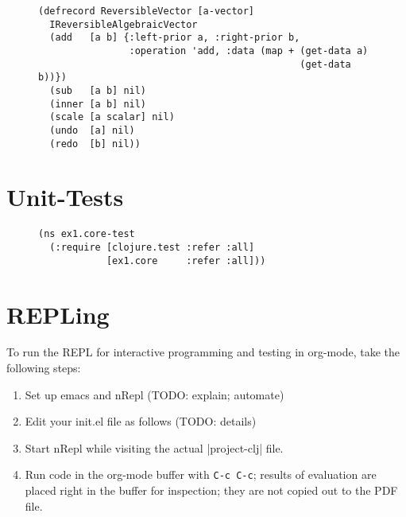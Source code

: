 \documentclass[11pt]{article}
\begin{document}
\begin{figure}[H]
\label{reversible-algebraic-vector-on-vector}
\begin{verbatim}
(defrecord ReversibleVector [a-vector]
  IReversibleAlgebraicVector
  (add   [a b] {:left-prior a, :right-prior b,
                :operation 'add, :data (map + (get-data a)
                                              (get-data b))})
  (sub   [a b] nil)
  (inner [a b] nil)
  (scale [a scalar] nil)
  (undo  [a] nil)
  (redo  [b] nil))
\end{verbatim}
\end{figure}
\section{Unit-Tests}
\label{sec-3}

\begin{figure}[H]
\label{test-namespace}
\begin{verbatim}
(ns ex1.core-test
  (:require [clojure.test :refer :all]
            [ex1.core     :refer :all]))
\end{verbatim}
\end{figure}
\section{REPLing}
\label{sec-4}
\label{sec:emacs-repl}
To run the REPL for interactive programming and testing in org-mode,
take the following steps:
\begin{enumerate}
\item Set up emacs and nRepl (TODO: explain; automate)
\item Edit your init.el file as follows (TODO: details)
\item Start nRepl while visiting the actual |project-clj| file.
\item Run code in the org-mode buffer with \verb|C-c C-c|; results of
evaluation are placed right in the buffer for inspection; they are
not copied out to the PDF file.
\end{enumerate}
\end{document}
